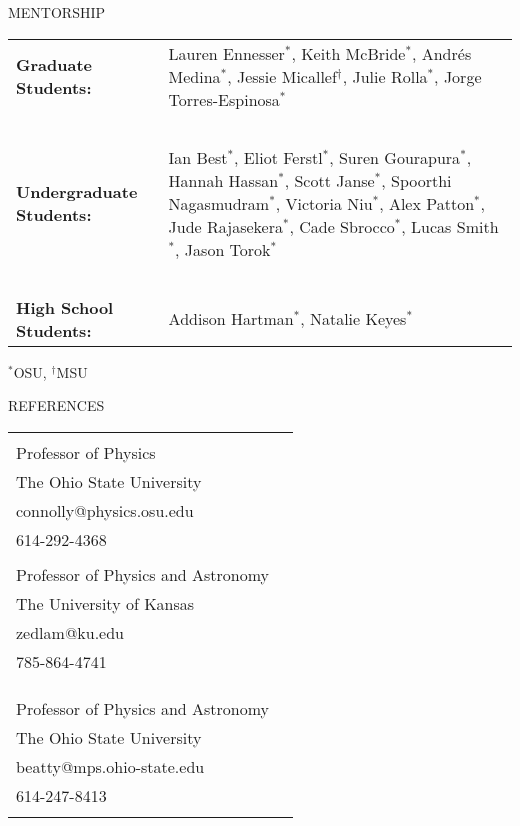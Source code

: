 \documentclass{resume} %
\begin{document}
\begin{rSection}{MENTORSHIP}
\begin{table}[h]
\begin{tabularx}{\textwidth}{l X}
 {\bf Graduate Students:}  & Lauren Ennesser$^*$, Keith McBride$^*$, Andr\'es Medina$^*$, Jessie Micallef$^\dagger$, Julie Rolla$^*$,  Jorge Torres-Espinosa$^*$ \\
 ~ & ~ \\
{\bf Undergraduate Students:}  & Ian Best$^*$, Eliot Ferstl$^*$, Suren Gourapura$^*$, Hannah Hassan$^*$, Scott Janse$^*$, Spoorthi Nagasmudram$^*$, Victoria Niu$^*$, Alex Patton$^*$, Jude Rajasekera$^*$, Cade Sbrocco$^*$, Lucas Smith$^*$, Jason Torok$^*$ \\
~ & ~ \\
{\bf High School Students:} &  Addison Hartman$^*$, Natalie Keyes$^*$\\
\end{tabularx}
\end{table}
$^*$OSU, $^\dagger$MSU

\end{rSection}

\begin{rSection}{REFERENCES}

\begin{tabular}{lr}
\begin{minipage}[t]{2.5in}
{\bf Amy Connolly}\\
Professor of Physics\\
The Ohio State University\\
connolly@physics.osu.edu\\
614-292-4368\\
\end{minipage}
&
\begin{minipage}[t]{2.5in}
{\bf Dave Besson}\\
Professor of Physics and Astronomy\\
The University of Kansas\\
zedlam@ku.edu\\
785-864-4741\\
\end{minipage}
\\
\\ %
\begin{minipage}[t]{2.5in}
{\bf James Beatty}\\
Professor of Physics and Astronomy\\
The Ohio State University\\
beatty@mps.ohio-state.edu\\
614-247-8413\\
\end{minipage}
\end{tabular}

\end{rSection}
\end{document}
